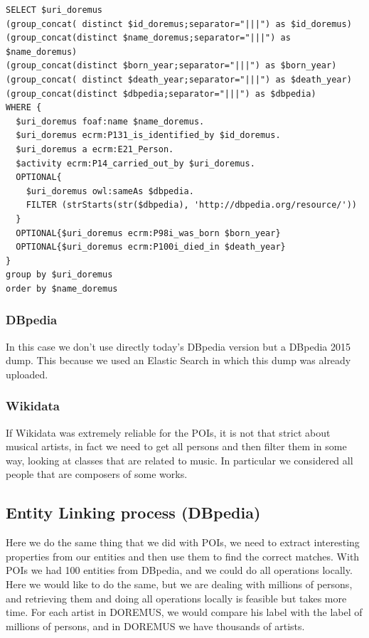 \documentclass[paper=a4, fontsize=11pt]{scrartcl}
\begin{document}
\begin{lstlisting}
SELECT $uri_doremus 
(group_concat( distinct $id_doremus;separator="|||") as $id_doremus)
(group_concat(distinct $name_doremus;separator="|||") as $name_doremus) 
(group_concat(distinct $born_year;separator="|||") as $born_year) 
(group_concat( distinct $death_year;separator="|||") as $death_year) 
(group_concat(distinct $dbpedia;separator="|||") as $dbpedia) 
WHERE {
  $uri_doremus foaf:name $name_doremus.
  $uri_doremus ecrm:P131_is_identified_by $id_doremus.
  $uri_doremus a ecrm:E21_Person.
  $activity ecrm:P14_carried_out_by $uri_doremus.
  OPTIONAL{
  	$uri_doremus owl:sameAs $dbpedia.
  	FILTER (strStarts(str($dbpedia), 'http://dbpedia.org/resource/'))
  }
  OPTIONAL{$uri_doremus ecrm:P98i_was_born $born_year}
  OPTIONAL{$uri_doremus ecrm:P100i_died_in $death_year}
} 
group by $uri_doremus
order by $name_doremus
\end{lstlisting}

\subsubsection{DBpedia}
In this case we don't use directly today's DBpedia version but a DBpedia 2015 dump. This because we used an Elastic Search in which this dump was already uploaded.

\subsubsection{Wikidata}
If Wikidata was extremely reliable for the POIs, it is not that strict about musical artists, in fact we need to get all persons and then filter them in some way, looking at classes that are related to music. In particular we considered all people that are composers of some works. 

\subsection{Entity Linking process (DBpedia)}
Here we do the same thing that we did with POIs, we need to extract interesting properties from our entities and then use them to find the correct matches. 
With POIs we had 100 entities from DBpedia, and we could do all operations locally. Here we would like to do the same, but we are dealing with millions of persons, and retrieving them and doing all operations locally is feasible but takes more time. For each artist in DOREMUS, we would compare his label with the label of millions of persons, and in DOREMUS we have thousands of artists.
\end{document}
